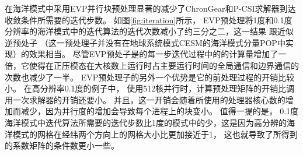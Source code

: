 在海洋模式中采用EVP并行块预处理显著的减少了ChronGear和P-CSI求解器到达收敛条件所需要的迭代步数。
如图\ref{fig:iteration}所示， EVP预处理将1度和0.1度分辨率的海洋模式中的迭代算法的迭代次数减小了约三分之二，这一结果 跟近似逆预处子\cite{smith1992parallel} （这一预处理子并没有在地球系统模式CESM的海洋模式分量POP中实现）的效果相当。
尽管EVP预处子是的每一步迭代过程中的的计算量增加了一倍，它使得在正压模态在大核数上运行时占主要运行时间的全局通信和边界通信的次数也减少了一半。 
EVP预处理子的另外一个优势是它的前处理过程的开销比较小。 
在高分辨率0.1度的例子中， 使用512核并行时，计算预处理矩阵的开销比调用一次求解器的开销还要小。 并且，这一开销会随着所使用的处理器核心数的增加而减少，因为并行度的增加会导致每个进程上的块变小。 
值得一提的是， 0.1度海洋模式中迭代算法所需要的迭代步数比1度的模式中的少，这是因为高分辨的海洋模式的网格在经纬两个方向上的网格大小比更加接近于1， 这也就导致了所得到的系数矩阵的条件数更小一些。 
